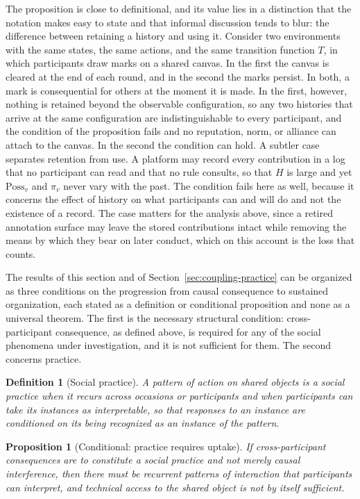 \documentclass[11pt]{article}
\newtheorem{definition}{Definition}
\newtheorem{proposition}{Proposition}
\theoremstyle{remark}
\newcommand{\Hh}{H}
\begin{document}
The proposition is close to definitional, and its value lies in a distinction that the notation makes easy to state and that informal discussion tends to blur: the difference between retaining a history and using it. Consider two environments with the same states, the same actions, and the same transition function $T$, in which participants draw marks on a shared canvas. In the first the canvas is cleared at the end of each round, and in the second the marks persist. In both, a mark is consequential for others at the moment it is made. In the first, however, nothing is retained beyond the observable configuration, so any two histories that arrive at the same configuration are indistinguishable to every participant, and the condition of the proposition fails and no reputation, norm, or alliance can attach to the canvas. In the second the condition can hold. A subtler case separates retention from use. A platform may record every contribution in a log that no participant can read and that no rule consults, so that $\Hh$ is large and yet $\mathrm{Poss}_v$ and $\pi_v$ never vary with the past. The condition fails here as well, because it concerns the effect of history on what participants can and will do and not the existence of a record. The case matters for the analysis above, since a retired annotation surface may leave the stored contributions intact while removing the means by which they bear on later conduct, which on this account is the loss that counts.

The results of this section and of Section~\ref{sec:coupling-practice} can be organized as three conditions on the progression from causal consequence to sustained organization, each stated as a definition or conditional proposition and none as a universal theorem. The first is the necessary structural condition: cross-participant consequence, as defined above, is required for any of the social phenomena under investigation, and it is not sufficient for them. The second concerns practice.

\begin{definition}[Social practice]
A pattern of action on shared objects is a \emph{social practice} when it recurs across occasions or participants and when participants can take its instances as interpretable, so that responses to an instance are conditioned on its being recognized as an instance of the pattern.
\end{definition}

\begin{proposition}[Conditional: practice requires uptake]
If cross-participant consequences are to constitute a social practice and not merely causal interference, then there must be recurrent patterns of interaction that participants can interpret, and technical access to the shared object is not by itself sufficient.
\end{proposition}
\end{document}

